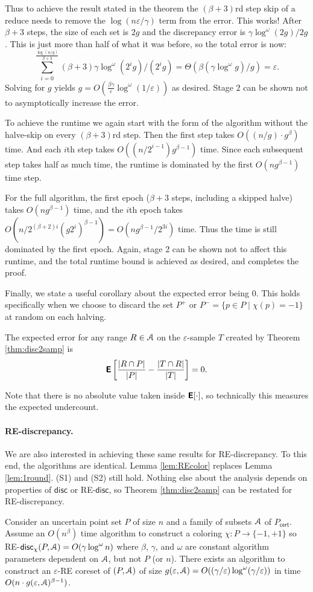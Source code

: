 \documentclass[11pt]{myclass}
\newcommand{\eps}{\varepsilon}
\newcommand{\Eu}[1]{\ensuremath{\EuScript{#1}}}
\newcommand{\E}{\textbf{\textsf{E}}}
\newcommand{\disc}{\textsf{disc}}
\newcommand{\cert}{\textsf{cert}}
\newcommand{\RE}{\textsf{RE}\xspace}
\newcommand{\Paragraph}[1]{\paragraph{\sffamily\textbf{#1.}}}
\begin{document}
Thus to achieve the result stated in the theorem the $(\beta+3)$rd step skip of a reduce needs to remove the $\log(n\eps/\gamma)$ term from the error.  This works!  After $\beta+3$ steps, the size of each set is $2g$ and the discrepancy error is $\gamma \log^\omega(2g) / 2g$.  This is just more than half of what it was before, so the total error is now:
\[\sum_{i=0}^{\frac{\log(n/g)}{\beta+3}} (\beta+3) \gamma \log^\omega(2^i g) / (2^i g) = \Theta(\beta (\gamma \log^\omega g)/g) = \eps. \]  Solving for $g$ yields $g = O(\frac{\beta \gamma}{\eps} \log^\omega(1/\eps))$ as desired.  
Stage 2 can be shown not to asymptotically increase the error.  

To achieve the runtime we again start with the form of the algorithm without the halve-skip on every $(\beta+3)$rd step.  Then the first step takes $O((n/g) \cdot g^{\beta})$ time.  And each $i$th step takes $O((n/2^{i-1}) g^{\beta-1})$ time.  Since each subsequent step takes half as much time, the runtime is dominated by the first $O(n g^{\beta-1})$ time step.  

For the full algorithm, the first epoch ($\beta+3$ steps, including a skipped halve) takes $O(n g^{\beta-1})$ time, and the $i$th epoch takes $O(n/2^{(\beta+2)i} (g 2^i)^{\beta-1}) = O(n g^{\beta-1} / 2^{3i})$ time.  Thus the time is still dominated by the first epoch.  Again, stage 2 can be shown not to affect this runtime, and the total runtime bound is achieved as desired, and completes the proof.  

Finally, we state a useful corollary about the expected error being $0$.  This holds specifically when we choose to discard the set $P^+$ or $P^- = \{p \in P \mid \chi(p) = -1\}$ at random on each halving.  

\begin{corollary}
\label{cor:E0}
The expected error for any range $R \in \Eu{A}$ on the $\eps$-sample $T$ created by Theorem \ref{thm:disc2samp} is 
\[
\E \left[ \frac{|R \cap P|}{|P|} - \frac{|T \cap R|}{|T|} \right]  = 0.
\]  
\end{corollary}
Note that there is no absolute value taken inside $\E[\cdot]$, so technically this measures the expected undercount. 


\Paragraph{\RE-discrepancy}
We are also interested in achieving these same results for \RE-discrepancy.  To this end, the algorithms are identical.  Lemma \ref{lem:REcolor} replaces Lemma \ref{lem:1round}.  (S1) and (S2) still hold.  Nothing else about the analysis depends on properties of $\disc$ or \RE-$\disc$, so Theorem \ref{thm:disc2samp} can be restated for \RE-discrepancy.  


\begin{theorem}
Consider an uncertain point set $P$ of size $n$ and a family of subsets $\Eu{A}$ of $P_\cert$.
Assume an $O(n^\beta)$ time algorithm to construct a coloring $\chi : P \to \{-1,+1\}$ so \RE-$\disc_\chi(P,\Eu{A}) = O(\gamma \log^\omega n)$ where $\beta$, $\gamma$, and $\omega$ are constant algorithm parameters dependent on $\Eu{A}$, but not $P$ (or $n$).  
There exists an algorithm to construct an $\eps$-\RE coreset of $(P,\Eu{A})$ of size $g(\eps,\Eu{A}) = O((\gamma/\eps) \log^\omega(\gamma/\eps))$ in time 
$O(n \cdot g(\eps,\Eu{A})^{\beta-1})$.  
\label{thm:RE-disc2samp}
\end{theorem}
\end{document}
